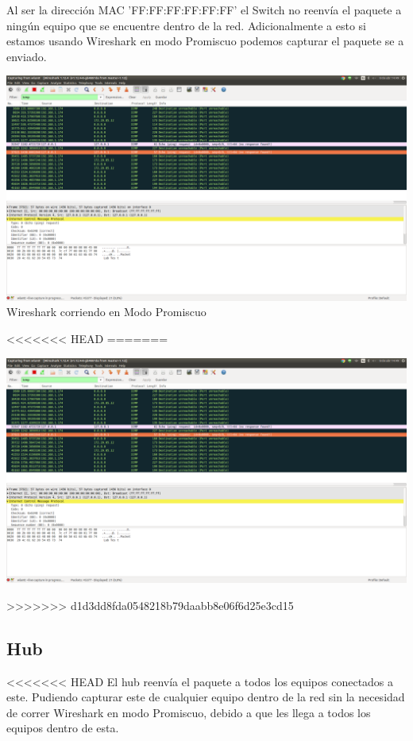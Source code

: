 \documentclass[spanish]{udpreport}
\begin{document}
Al ser la dirección MAC 'FF:FF:FF:FF:FF:FF' el Switch no reenvía el paquete a ningún equipo que se encuentre dentro de la red. Adicionalmente a esto si estamos usando Wireshark en modo Promiscuo podemos capturar el paquete se a enviado.

\begin{center}
	\includegraphics[scale=.21]{imagenes/Switch/FF.png}
	\\ Wireshark corriendo en Modo Promiscuo
\end{center}

<<<<<<< HEAD
=======
\begin{center}
	\includegraphics[scale=.37]{imagenes/Switch/Test_1_Wireshark.png}
\end{center}

>>>>>>> d1d3dd8fda0548218b79daabb8e06f6d25e3cd15


\subsection{Hub}

<<<<<<< HEAD
El hub reenvía el paquete a todos los equipos conectados a este. Pudiendo capturar este de cualquier equipo dentro de la red sin la necesidad de correr Wireshark en modo Promiscuo, debido a que les llega a todos los equipos dentro de esta.
\end{document}
